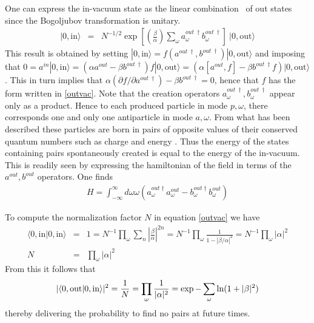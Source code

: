 \documentclass[12pt,oneside]{report}
\def\om{\omega	}
\begin{document}
One can express the in-vacuum state 
as the linear combination~\cite{KaUm}
of out states since the Bogoljubov transformation is unitary.
\begin{eqnarray}
|0, \mbox{in} \rangle & = & N^{-1/2} \exp \left[\left(\frac {\beta}
{ \alpha}\right) \sum_\omega
a^{out\ \dagger }_{\omega} b^{out\ \dagger }_{\omega}\right]
\ |0,\mbox{out} \rangle \label{outvac}
\end{eqnarray}
This result is  obtained by setting $|0, \mbox{in} \rangle =
 f(a^{out\ \dagger },b^{out\ \dagger }) |0,\mbox{out} \rangle $ and 
imposing that $0= a^{in} |0, \mbox{in} \rangle =
(\alpha a^{out} - \beta b^{out\ \dagger } ) 
f |0,\mbox{out} \rangle = 
(\alpha [ a^{out}, f] - \beta b^{out\ \dagger } f)|0,\mbox{out} \rangle$. This in turn
implies that $ \alpha (\partial f / \partial a^{out\ \dagger }) -
 \beta b^{out\ \dagger } =0$, hence that $f$ has the form 
written in \ref{outvac}.
Note that the creation operators $a^{out\ \dagger }_{\omega}, b^{out\ \dagger
}_{\omega}$ appear only as a product. Hence to each produced particle in mode
$p,\om$, there corresponds one and only one antiparticle in mode $a,\om$.
  From what has been
described these particles are born in pairs of opposite values of their
conserved quantum numbers such as charge and energy . Thus the energy of 
the states containing pairs spontaneously created is equal to the energy of
 the in-vacuum. This is readily seen by expressing the hamiltonian of the 
field in terms of the $a^{out}, b^{out}$ operators. One finds
\begin{eqnarray}
H= \int ^{\infty}_{-\infty} d\omega \omega 
(a^{out\dagger }_{\omega}a_{\omega}^{out}
- b^{out\dagger }_{\omega}b_{\omega}^{out}) 
\label{hamiltE}
\end{eqnarray}


To compute the normalization factor $N$ in equation \ref{outvac} we have 
\begin{eqnarray} \langle 0, \mbox{in} |0, \mbox{in} \rangle & = & 1  =  
N^{-1} \prod_\omega\sum_n \left|\frac \beta \alpha \right|^{2n}
=N^{-1} \prod_\omega \frac{1}{1-|\beta/\alpha|^2} = N^{-1}
\prod_\omega |\alpha|^2 \nonumber \\
N & = & \prod_\omega |\alpha|^2 \label{norme}
\end{eqnarray}
\noindent From this it follows
that
\begin{equation}
|\langle 0,\mbox{out}|0,\mbox{in} \rangle|^2 = {1\over N} = \prod_\omega
\frac{1}{|\alpha|^2} = \exp - \sum_\omega \ln (1 + |\beta|^2) \label{inout}
\label{Z}
\end{equation}
thereby delivering  the probability to find no pairs at future times.
\end{document}
